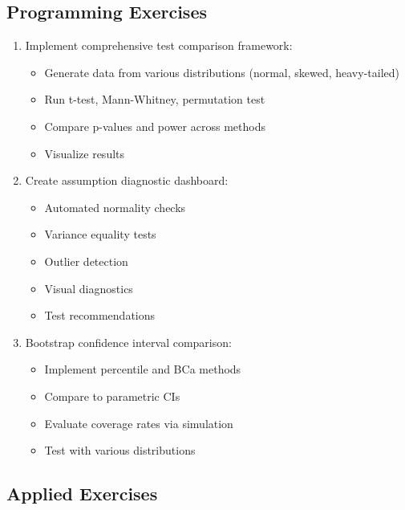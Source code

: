 \subsection{Programming Exercises}

\begin{enumerate}
    \item Implement comprehensive test comparison framework:
    \begin{itemize}
        \item Generate data from various distributions (normal, skewed, heavy-tailed)
        \item Run t-test, Mann-Whitney, permutation test
        \item Compare p-values and power across methods
        \item Visualize results
    \end{itemize}

    \item Create assumption diagnostic dashboard:
    \begin{itemize}
        \item Automated normality checks
        \item Variance equality tests
        \item Outlier detection
        \item Visual diagnostics
        \item Test recommendations
    \end{itemize}

    \item Bootstrap confidence interval comparison:
    \begin{itemize}
        \item Implement percentile and BCa methods
        \item Compare to parametric CIs
        \item Evaluate coverage rates via simulation
        \item Test with various distributions
    \end{itemize}
\end{enumerate}

\subsection{Applied Exercises}

